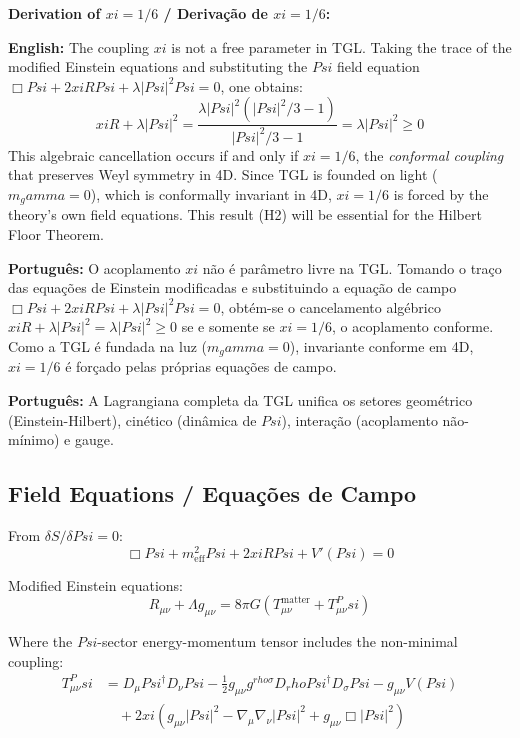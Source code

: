 \documentclass[12pt,a4paper]{article}
\def\Psi{Psi}%
\def\gamma{gamma}%
\def\xi{xi}%
\def\rho{rho}%
\begin{document}
\textbf{Derivation of $\xi = 1/6$ / Derivação de $\xi = 1/6$:}

\textbf{English:} The coupling $\xi$ is not a free parameter in TGL. Taking the trace of the modified Einstein equations and substituting the $\Psi$ field equation $\Box\Psi + 2\xi R\Psi + \lambda|\Psi|^2\Psi = 0$, one obtains:
\begin{equation}
\xi R + \lambda|\Psi|^2 = \frac{\lambda|\Psi|^2(|\Psi|^2/3 - 1)}{|\Psi|^2/3 - 1} = \lambda|\Psi|^2 \geq 0
\end{equation}
This algebraic cancellation occurs if and only if $\xi = 1/6$, the \emph{conformal coupling} that preserves Weyl symmetry in 4D. Since TGL is founded on light ($m_\gamma = 0$), which is conformally invariant in 4D, $\xi = 1/6$ is forced by the theory's own field equations. This result (H2) will be essential for the Hilbert Floor Theorem.

\textbf{Português:} O acoplamento $\xi$ não é parâmetro livre na TGL. Tomando o traço das equações de Einstein modificadas e substituindo a equação de campo $\Box\Psi + 2\xi R\Psi + \lambda|\Psi|^2\Psi = 0$, obtém-se o cancelamento algébrico $\xi R + \lambda|\Psi|^2 = \lambda|\Psi|^2 \geq 0$ se e somente se $\xi = 1/6$, o acoplamento conforme. Como a TGL é fundada na luz ($m_\gamma = 0$), invariante conforme em 4D, $\xi = 1/6$ é forçado pelas próprias equações de campo.

\textbf{Português:} A Lagrangiana completa da TGL unifica os setores geométrico (Einstein-Hilbert), cinético (dinâmica de $\Psi$), interação (acoplamento não-mínimo) e gauge.

\subsection{Field Equations / Equações de Campo}

From $\delta S/\delta\Psi = 0$:
\begin{equation}
\Box\Psi + m_{\text{eff}}^2\Psi + 2\xi R\Psi + V'(\Psi) = 0
\end{equation}

Modified Einstein equations:
\begin{equation}
R_{\mu\nu} + \Lambda g_{\mu\nu} = 8\pi G(T_{\mu\nu}^{\text{matter}} + T_{\mu\nu}^\Psi)
\end{equation}

Where the $\Psi$-sector energy-momentum tensor includes the non-minimal coupling:
\begin{align}
T_{\mu\nu}^\Psi &= D_\mu\Psi^\dagger D_\nu\Psi - \frac{1}{2}g_{\mu\nu}g^{\rho\sigma}D_\rho\Psi^\dagger D_\sigma\Psi - g_{\mu\nu}V(\Psi) \nonumber\\
&\quad + 2\xi\left(g_{\mu\nu}|\Psi|^2 - \nabla_\mu\nabla_\nu|\Psi|^2 + g_{\mu\nu}\Box|\Psi|^2\right)
\end{align}
\end{document}
